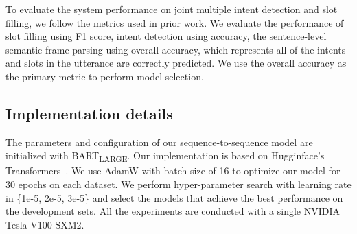 \documentclass[11pt]{article}
\begin{document}
\begin{table}[ht]
\centering
\caption{Statistics of our used datasets.}
\label{table:dataset}
\end{table}



To evaluate the system performance on joint multiple intent detection and slot filling, we follow the metrics used in prior work\cite{DBLP:conf/naacl/GooGHHCHC18,DBLP:conf/emnlp/QinCLWL19}. We evaluate the performance of slot filling using F1 score, intent detection using accuracy, the sentence-level semantic frame parsing using overall accuracy, which represents all of the intents and slots in the utterance are correctly predicted. We use the overall accuracy as the primary metric to perform model selection.

\subsection{Implementation details}
The parameters and configuration of our sequence-to-sequence model are initialized with BART\textsubscript{LARGE}\cite{DBLP:conf/acl/LewisLGGMLSZ20}. Our implementation is based on Hugginface's Transformers~\cite{Wolf2019Huggingface}. We use AdamW\cite{DBLP:conf/iclr/LoshchilovH19} with batch size of 16 to optimize our model for 30 epochs on each dataset. We perform hyper-parameter search with learning rate in \{1e-5, 2e-5, 3e-5\} and select the models that achieve the best performance on the development sets. All the experiments are conducted with a single NVIDIA Tesla V100 SXM2.
\end{document}
